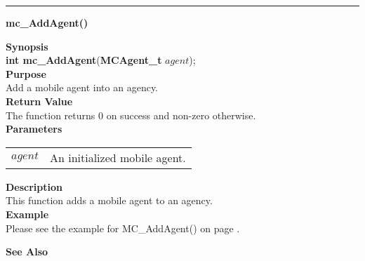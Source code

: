 \noindent
\vspace{5pt}
\rule{6.5in}{0.015in}
\noindent
{}
{\LARGE \bf mc\_AddAgent()}\\

\noindent
{\bf Synopsis}\\
{\bf int mc\_AddAgent}({\bf MCAgent\_t} $agent$);\\

\noindent
{\bf Purpose}\\
Add a mobile agent into an agency.\\

\noindent
{\bf Return Value}\\
The function returns 0 on success and non-zero otherwise.\\

\noindent
{\bf Parameters}
\vspace{-0.1in}
\begin{description}
\item
\begin{tabular}{p{10 mm}p{145 mm}} 
$agent$ & An initialized mobile agent.
\end{tabular}
\end{description}

\noindent
{\bf Description}\\
This function adds a mobile agent to an agency.\\

\noindent
{\bf Example}\\
    Please see the example for MC\_AddAgent() on page \pageref{api:MC_AddAgent()}.\\
\noindent

\noindent
{\bf See Also}\\

